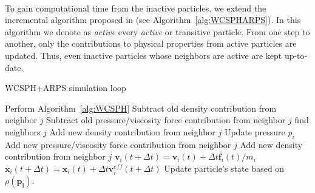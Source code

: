 \paragraph*{}
To gain computational time from the inactive particles, we extend the incremental algorithm proposed in \cite{Artemova2012} (see Algorithm~\ref{alg:WCSPHARPS}).
In this algorithm we denote as \emph{active} every \emph{active} or {transitive} particle.
From one step to another, only the contributions to physical properties from active particles are updated. 
Thus, even inactive particles whose neighbors are active are kept up-to-date.

\newpage

\begin{algorithm}[H]
    \caption[ARPS: WCSPH+ARPS simulation]{WCSPH+ARPS simulation loop}
    \label{alg:WCSPHARPS}
    \begin{algorithmic}
        \State Perform Algorithm~\ref{alg:WCSPH}
        \Else
            \State Subtract old density contribution from neighbor $j$
	        \State Subtract old pressure/viscosity force contribution from neighbor $j$
            \EndFor
            \State find neighbors $j$
            \EndFor
            \State Add new density contribution from neighbor $j$
            \State Update pressure $p_{i}$
	        \State Add new pressure/viscosity force contribution from neighbor $j$
            \State Add new density contribution from neighbor $j$
            \EndFor
            \State $\mathbf{v}_{i}(t+\Delta t) = \mathbf{v}_{i}(t) + \Delta t \mathbf{f}_{i}(t)/m_{i}$
            \State $\mathbf{x}_{i}(t+\Delta t) = \mathbf{x}_{i}(t) + \Delta t \mathbf{v}^{eff}_{i}(t+\Delta t)$
            \State Update particle's state based on $\rho(\mathbf{p_{i}})$.
            \EndFor
        \EndIf
    \end{algorithmic}
\end{algorithm}

\newpage 

